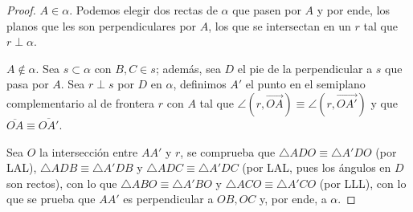 \documentclass[11pt,a4paper]{book}
\begin{document}
\begin{proof}
$A\in\alpha$. Podemos elegir dos rectas de $\alpha$ que pasen por $A$ y por ende, los planos que les son perpendiculares por $A$, los que se intersectan en un $r$ tal que $r\perp\alpha$.

$A\notin\alpha$. Sea $s\subset\alpha$ con $B,C\in s$; además, sea $D$ el pie de la perpendicular a $s$ que pasa por $A$. Sea $r\perp s$ por $D$ en $\alpha$, definimos $A'$ el punto en el semiplano complementario al de frontera $r$ con $A$ tal que $\angle(r,\overrightarrow{OA})\equiv\angle(r,\overrightarrow{OA'})$ y que $\overline{OA}\equiv\overline{OA'}$.

Sea $O$ la intersección entre $AA'$ y $r$, se comprueba que $\triangle ADO\equiv\triangle A'DO$ (por LAL), $\triangle ADB\equiv\triangle A'DB$ y $\triangle ADC\equiv\triangle A'DC$ (por LAL, pues los ángulos en $D$ son rectos), con lo que $\triangle ABO\equiv\triangle A'BO$ y $\triangle ACO\equiv\triangle A'CO$ (por LLL), con lo que se prueba que $AA'$ es perpendicular a $OB,OC$ y, por ende, a $\alpha$.
\end{proof}
\end{document}
